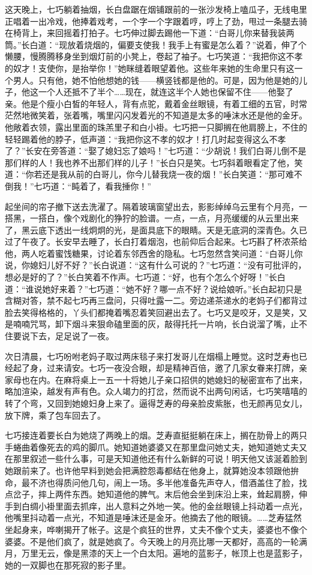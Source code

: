 \par 这天晚上，七巧躺着抽烟，长白盘踞在烟铺跟前的一张沙发椅上嗑瓜子，无线电里正唱着一出冷戏，他捧着戏考，一个字一个字跟着哼，哼上了劲，甩过一条腿去骑在椅背上，来回摇着打拍子。七巧伸过脚去踢他一下道：“白哥儿你来替我装两筒。”长白道：“现放着烧烟的，偏要支使我！我手上有蜜是怎么着？”说着，伸了个懒腰，慢腾腾移身坐到烟灯前的小凳上，卷起了袖子。七巧笑道：“我把你这不孝的奴才！支使你，是抬举你！”她眯缝着眼望着他。这些年来她的生命里只有这一个男人。只有他，她不怕他想她的钱——横竖钱都是他的。可是，因为他是她的儿子，他这一个人还抵不了半个……现在，就连这半个人她也保留不住——他娶了亲。他是个瘦小白皙的年轻人，背有点驼，戴着金丝眼镜，有着工细的五官，时常茫然地微笑着，张着嘴，嘴里闪闪发着光的不知道是太多的唾沫水还是他的金牙。他敞着衣领，露出里面的珠羔里子和白小褂。七巧把一只脚搁在他肩膀上，不住的轻轻踢着他的脖子，低声道：“我把你这不孝的奴才！打几时起变得这么不孝了？”长安在旁答道：“娶了媳妇忘了娘吗！”七巧道：“少胡说！我们白哥儿倒不是那们样的人！我也养不出那们样的儿子！”长白只是笑。七巧斜着眼看定了他，笑道：“你若还是我从前的白哥儿，你今儿替我烧一夜的烟！”长白笑道：“那可难不倒我！”七巧道：“盹着了，看我捶你！”
\par 起坐间的帘子撤下送去洗濯了。隔着玻璃窗望出去，影影绰绰乌云里有个月亮，一搭黑，一搭白，像个戏剧化的狰狞的脸谱。一点，一点，月亮缓缓的从云里出来了，黑云底下透出一线炯炯的光，是面具底下的眼睛。天是无底洞的深青色。久已过了午夜了。长安早去睡了，长白打着烟泡，也前仰后合起来。七巧斟了杯浓茶给他，两人吃着蜜饯糖果，讨论着东邻西舍的隐私。七巧忽然含笑问道：“白哥儿你说，你媳妇儿好不好？”长白说道：“这有什么可说的？”七巧道：“没有可批评的，想必是好的了？”长白笑着不作声。七巧道：“好，也有个怎么个好呀！”长白道：“谁说她好来着？”七巧道：“她不好？哪一点不好？说给娘听。”长白起初只是含糊对答，禁不起七巧再三盘问，只得吐露一二。旁边递茶递水的老妈子们都背过脸去笑得格格的，丫头们都掩着嘴忍着笑回避出去了。七巧又是咬牙，又是笑，又是喃喃咒骂，卸下烟斗来狠命磕里面的灰，敲得托托一片响，长白说溜了嘴，止不住要说下去，足足说了一夜。
\par 次日清晨，七巧吩咐老妈子取过两床毯子来打发哥儿在烟榻上睡觉。这时芝寿也已经起了身，过来请安。七巧一夜没合眼，却是精神百倍，邀了几家女眷来打牌，亲家母也在内。在麻将桌上一五一十将她儿子亲口招供的她媳妇的秘密宣布了出来，略加渲染，越发有声有色。众人竭力的打岔，然而说不出两句闲话，七巧笑嘻嘻的转了个弯，又回到她媳妇身上来了。逼得芝寿的母亲脸皮紫胀，也无颜再见女儿，放下牌，乘了包车回去了。
\par 七巧接连着要长白为她烧了两晚上的烟。芝寿直挺挺躺在床上，搁在肋骨上的两只手蜷曲着像死去的鸡的脚爪。她知道她婆婆又在那里盘问她丈夫，她知道她丈夫又在那里叙述一些什么事，可是天知道他还有什么新鲜的可说！明天他又该涎着脸到她跟前来了。也许他早料到她会把满腔怨毒都结在他身上，就算她没本领跟他拚命，最不济也得质问他几句，闹上一场。多半他准备先声夺人，借酒盖住了脸，找点岔子，摔上两件东西。她知道他的脾气。末后他会坐到床沿上来，耸起肩膀，伸手到白绸小褂里面去抓痒，出人意料之外地一笑。他的金丝眼镜上抖动着一点光，他嘴里抖动着一点光，不知道是唾沫还是金牙。他摘去了他的眼镜。……芝寿猛然坐起身来，哗喇揭开了帐子。这是个疯狂的世界，丈夫不像个丈夫，婆婆也不像个婆婆。不是他们疯了，就是她疯了。今天晚上的月亮比哪一天都好，高高的一轮满月，万里无云，像是黑漆的天上一个白太阳。遍地的蓝影子，帐顶上也是蓝影子，她的一双脚也在那死寂的影子里。
